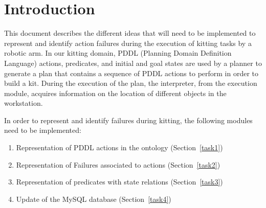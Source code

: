 \section{Introduction}

This document describes the different ideas that will need to be implemented to represent and identify action failures during the execution of kitting tasks by a robotic arm. In our kitting domain, PDDL (Planning Domain Definition Language) actions, predicates, and initial and goal states are used by a planner to generate a plan that contains a sequence of PDDL actions to perform in order to build a kit. During the execution of the plan, the interpreter, from the execution module, acquires information on the location of different objects in the workstation. 


In order to represent and identify failures during kitting, the following modules need to be implemented:
\begin{enumerate}
 \item Representation of PDDL actions in the ontology (Section~\ref{task1})
\item Representation of Failures associated to actions (Section~\ref{task2})
\item Representation of predicates with state relations (Section~\ref{task3})
\item Update of the MySQL database (Section~\ref{task4})
\end{enumerate}
